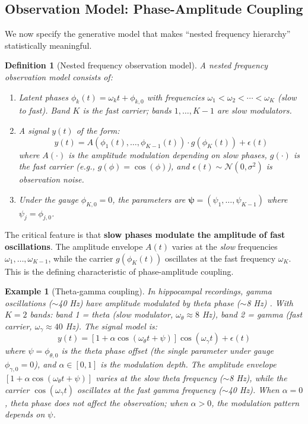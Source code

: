 \documentclass[12pt]{article}
\newtheorem{definition}[theorem]{Definition}
\newtheorem{example}[theorem]{Example}
\begin{document}
\subsection{Observation Model: Phase-Amplitude Coupling}

We now specify the generative model that makes ``nested frequency hierarchy'' statistically meaningful.

\begin{definition}[Nested frequency observation model]
\label{def:observation}
A \emph{nested frequency observation model} consists of:
\begin{enumerate}
    \item Latent phases $\phi_k(t) = \omega_k t + \phi_{k,0}$ with frequencies $\omega_1 < \omega_2 < \cdots < \omega_K$ (slow to fast). Band $K$ is the fast \emph{carrier}; bands $1, \ldots, K-1$ are slow \emph{modulators}.
    \item A signal $y(t)$ of the form:
    \begin{equation}
    y(t) = A(\phi_1(t), \ldots, \phi_{K-1}(t)) \cdot g(\phi_K(t)) + \epsilon(t)
    \label{eq:signal}
    \end{equation}
    where $A(\cdot)$ is the amplitude modulation depending on slow phases, $g(\cdot)$ is the fast carrier (e.g., $g(\phi) = \cos(\phi)$), and $\epsilon(t) \sim \mathcal{N}(0, \sigma^2)$ is observation noise.
    \item Under the gauge $\phi_{K,0} = 0$, the parameters are $\bm{\psi} = (\psi_1, \ldots, \psi_{K-1})$ where $\psi_j = \phi_{j,0}$.
\end{enumerate}
\end{definition}

The critical feature is that \textbf{slow phases modulate the amplitude of fast oscillations}. The amplitude envelope $A(t)$ varies at the \emph{slow} frequencies $\omega_1, \ldots, \omega_{K-1}$, while the carrier $g(\phi_K(t))$ oscillates at the fast frequency $\omega_K$. This is the defining characteristic of phase-amplitude coupling.

\begin{example}[Theta-gamma coupling]
\label{ex:theta_gamma_intro}
In hippocampal recordings, gamma oscillations ($\sim$40 Hz) have amplitude modulated by theta phase ($\sim$8 Hz) \citep{lisman2013theta}. With $K=2$ bands: band 1 = theta (slow modulator, $\omega_\theta \approx 8$ Hz), band 2 = gamma (fast carrier, $\omega_\gamma \approx 40$ Hz). The signal model is:
\begin{equation}
y(t) = [1 + \alpha \cos(\omega_\theta t + \psi)] \cos(\omega_\gamma t) + \epsilon(t)
\label{eq:theta_gamma}
\end{equation}
where $\psi = \phi_{\theta,0}$ is the theta phase offset (the single parameter under gauge $\phi_{\gamma,0} = 0$), and $\alpha \in [0,1]$ is the modulation depth. The amplitude envelope $[1 + \alpha\cos(\omega_\theta t + \psi)]$ varies at the \emph{slow} theta frequency ($\sim$8 Hz), while the carrier $\cos(\omega_\gamma t)$ oscillates at the \emph{fast} gamma frequency ($\sim$40 Hz). When $\alpha = 0$, theta phase does not affect the observation; when $\alpha > 0$, the modulation pattern depends on $\psi$.
\end{example}
\end{document}
